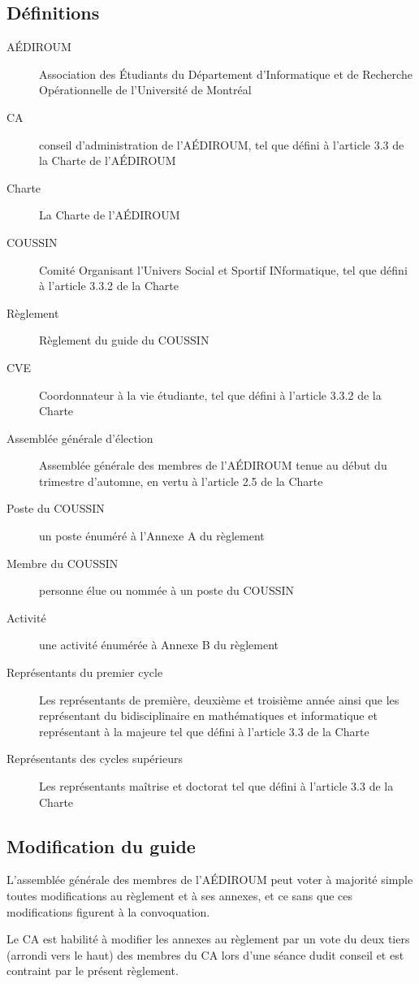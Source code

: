 \documentclass{aediroum}
\begin{document}
\subsection{Définitions}
\begin{description}
	\item[AÉDIROUM] Association des Étudiants du Département d'Informatique et de Recherche Opérationnelle de l'Université de Montréal
	\item[CA] conseil d'administration de l'AÉDIROUM, tel que défini à l'article 3.3 de la Charte de l'AÉDIROUM
	\item[Charte] La Charte de l'AÉDIROUM
	\item[COUSSIN] Comité Organisant l'Univers Social et Sportif INformatique, tel que défini à l'article 3.3.2 de la Charte
	\item[Règlement] Règlement du guide du COUSSIN
	\item[CVE] Coordonnateur à la vie étudiante, tel que défini à l'article 3.3.2 de la Charte
	\item[Assemblée générale d'élection] Assemblée générale des membres de l'AÉDIROUM tenue au début du trimestre d'automne, en vertu à l'article 2.5 de la Charte
	\item[Poste du COUSSIN] un poste énuméré à l'Annexe A du règlement
	\item[Membre du COUSSIN] personne élue ou nommée à un poste du COUSSIN
	\item[Activité] une activité énumérée à Annexe B du règlement
	\item[Représentants du premier cycle] Les représentants de première, deuxième et troisième année ainsi que les représentant du bidisciplinaire en mathématiques et informatique et représentant à la majeure tel que défini à l'article 3.3 de la Charte
	\item[Représentants des cycles supérieurs] Les représentants maîtrise et doctorat tel que défini à l'article 3.3 de la Charte
\end{description}

\subsection{Modification du guide}
L'assemblée générale des membres de l'AÉDIROUM peut voter à majorité simple toutes modifications au règlement et à ses annexes, et ce sans que ces modifications figurent à la convoquation.

Le CA est habilité à modifier les annexes au règlement par un vote du deux tiers (arrondi vers le haut) des membres du CA lors d'une séance dudit conseil et est contraint par le présent règlement.
\end{document}
